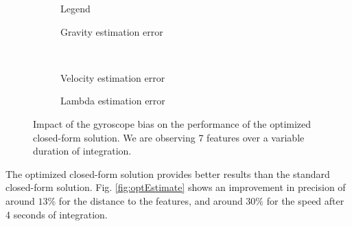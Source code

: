 \documentclass[letterpaper, 10 pt, conference]{ieeeconf}  %
\begin{document}
\begin{figure}
  \centering
        \hspace{0.2\columnwidth}%
        \begin{subfigure}[b]{0.3\columnwidth}
                \resizebox{\columnwidth}{!}{}
                \caption{Legend}

        \end{subfigure}%
        \begin{subfigure}[b]{0.5\columnwidth}
                \resizebox{\columnwidth}{!}{}
                \caption{Gravity estimation error}

        \end{subfigure}
        ~
        \begin{subfigure}[b]{0.5\columnwidth}
                \resizebox{\columnwidth}{!}{}
                \caption{Velocity estimation error}

        \end{subfigure}%
        \begin{subfigure}[b]{0.5\columnwidth}
                \resizebox{\columnwidth}{!}{}
                \caption{Lambda estimation error}

        \end{subfigure}
        \caption{Impact of the gyroscope bias on the performance of the optimized closed-form solution. We are observing 7 features  over a variable duration of integration. \label{fig:biasGyroOpt}}
\end{figure}


The optimized closed-form solution provides better results than the standard closed-form solution. Fig. \ref{fig:optEstimate} shows an improvement in precision of around $13\%$ for the distance to the features, and around $30\%$ for the speed after 4 seconds of integration.

\end{document}
